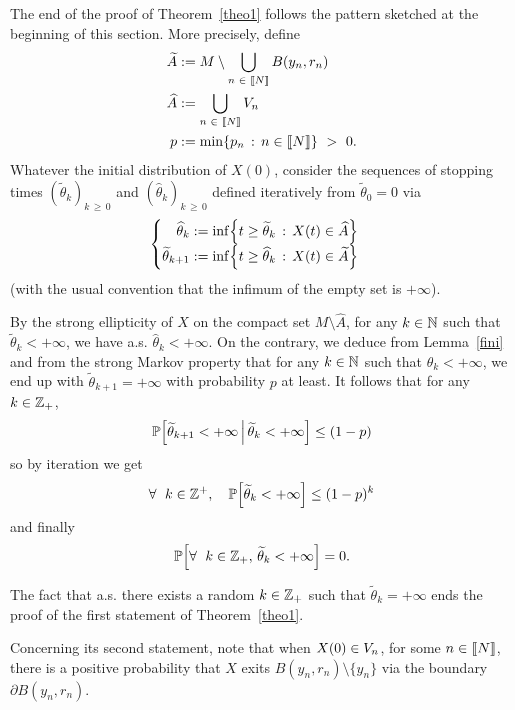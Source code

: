 \documentclass[AHL,Unicode,longabstracts,published]{cedram}
\makeatletter
\newcommand{\NN}{\mathbb{N}}
\newcommand{\PP}{\mathbb{P}}
\newcommand{\ZZ}{\mathbb{Z}}
\newcommand{\iy}{\infty}
\newcommand{\pa}{\partial}
\newcommand{\wi}{\widetilde}
\newcommand{\wit}{\widehat}
\newcommand{\fo}{\forall\ }
\let\originalleft\left
\let\originalright\right
\renewcommand{\left}{\mathopen{}\mathclose\bgroup\originalleft}
\renewcommand{\right}{\aftergroup\egroup\originalright}
\let\oldin\in
\renewcommand{\in}{\mathchoice{\oldin}{\oldin}{\,\oldin\,}{\,\oldin\,}}
\newenvironment{alcases}{\left\{\begingroup\arraycolsep=0pt\renewcommand{\arraystretch}{1.2}\begin{array}{r@{\;}l@{\quad}l}}{\end{array}\endgroup\right.}
\let\oldforall\forall
\renewcommand*{\forall}{\mathrel{\oldforall}}
\newcommand{\llbracket}{\mathopen{[\mkern -2.7mu[}}
\newcommand{\rrbracket}{\mathclose{]\mkern -2.7mu]}}
\newcommand{\lin}{\llbracket}
\newcommand{\rin}{\rrbracket}
\makeatother
\begin{document}
The end of the proof of Theorem~\ref{theo1} follows the pattern sketched at the beginning of this section. More precisely, define
\begin{align*}
\wi A&:= M\setminus \bigcup_{n\in\lin N\rin} B(y_n,r_n)\\
\wit A&:=  \bigcup_{n\in\lin N\rin} V_n\\
p&:=\min\{p_n\,:\, n\in\lin N\rin\}\ >\ 0.
\end{align*}
Whatever the initial distribution of $X(0)$, consider the sequences of stopping times $(\wi \theta_k)_{k\,\geq\,0}$ and $(\wit \theta_k)_{k\,\geq\,0}$ defined iteratively from $\wi\theta_0=0$ via
\begin{equation}\label{thetas}
\begin{alcases}
\wit \theta_k&:= \inf\left\{t\geq \wi\theta_k\,:\, X(t)\in \wit A\right\}\\[0.2em]
\wi \theta_{k+1}&:= \inf\left\{t\geq \wit\theta_k\,:\, X(t)\in \wi A\right\}
\end{alcases}
\end{equation}
(with the usual convention that the infimum of the empty set is $+\iy$).

By the strong ellipticity of $X$ on the compact set $M\setminus \wit A$, for any $k\in \NN$ such that $\wi \theta_k<+\iy$, we have a.s. $\wit \theta_k<+\iy$. On the contrary, we deduce from Lemma~\ref{fini} and from the strong Markov property that for any $k\in \NN$ such that $\wit \theta_k<+\iy$, we end up with $\wi \theta_{k+1}=+\iy$ with probability $p$ at least. It follows that for any $k\in\ZZ_+$,
\begin{equation*}
\PP\left[\wi \theta_{k+1}<+\iy\,\middle|\, \wi \theta_{k}<+\iy\right] \leq (1-p)
\end{equation*}
so by iteration we get
\begin{equation*}
\fo k\in\ZZ^+,\quad \PP\left[\wi \theta_{k}<+\iy\right]\leq (1-p)^k
\end{equation*} 
and finally
\begin{equation*}
\PP\left[\fo k\in\ZZ_+,\,\wi \theta_{k}<+\iy\right] = 0.
\end{equation*}


The fact that a.s. there exists a random $k\in\ZZ_+$ such that $\wi \theta_k=+\iy$ ends the proof of the first statement of Theorem~\ref{theo1}.

Concerning its second statement, note that when $X(0)\in V_n$, for some $n\in\lin N\rin$, there is a positive probability that $X$ exits $B(y_n,r_n)\setminus\{y_n\}$ via the boundary $\pa B(y_n,r_n)$.
\end{document}
